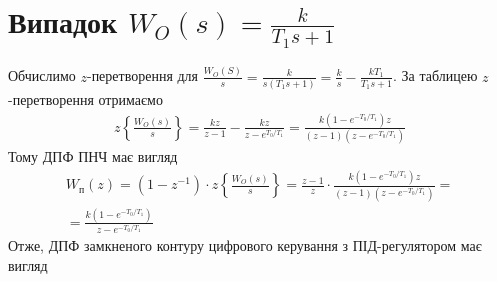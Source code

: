 \section{Випадок \texorpdfstring{$W_O(s) = \frac{k}{T_1 s + 1}$}{1}}
Обчислимо $z$-перетворення для $\frac{W_O(S)}{s} = \frac{k}{s(T_1 s + 1)} = \frac{k}{s} - \frac{k T_1}{T_1 s + 1}$.
За таблицею $z$-перетворення отримаємо
\begin{gather}
    z\left\{\frac{W_O(s)}{s} \right\} = 
    \frac{kz}{z-1} - \frac{kz}{z - e^{T_0 / T_1}} = 
    \frac{k \left(1 - e^{- T_0 / T_1}\right)z}{
        (z-1) \left(z - e^{- T_0 / T_1}\right)
    }
\end{gather}
Тому ДПФ ПНЧ має вигляд
\begin{gather}
    W_{\text{п}}(z) = \left(1 - z^{-1}\right) \cdot z\left\{\frac{W_O(s)}{s} \right\} = 
    \frac{z-1}{z} \cdot \frac{k \left(1 - e^{- T_0 / T_1}\right)z}{
        (z-1) \left(z - e^{- T_0 / T_1}\right)
    } = \nonumber \\ =
    \frac{k \left(1 - e^{- T_0 / T_1}\right)}{
        z - e^{- T_0 / T_1}
    }
\end{gather}
Отже, ДПФ замкненого контуру цифрового керування з ПІД-регулятором має вигляд
